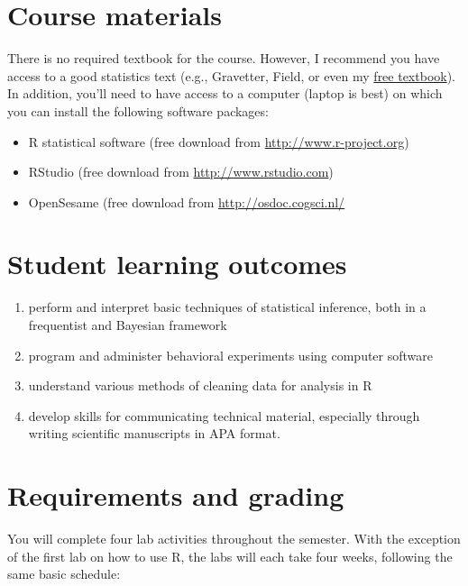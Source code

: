 \documentclass[10pt]{article}
\begin{document}
\section*{Course materials}
\label{sec:org4d7b8ef}

There is no required textbook for the course. However, I recommend you have access to a good statistics text (e.g., Gravetter, Field, or even my \href{https://learnstatswithjasp.com}{free textbook}).  In addition, you'll need to have access to a computer (laptop is best) on which you can install the following software packages:

\begin{itemize}
\item R statistical software (free download from \href{http://www.r-project.org}{http://www.r-project.org})
\item RStudio (free download from \href{http://www.rstudio.com}{http://www.rstudio.com})
\item OpenSesame (free download from \url{http://osdoc.cogsci.nl/}
\end{itemize}

\section*{Student learning outcomes}
\label{sec:org5684d9e}

\begin{enumerate}
\item perform and interpret basic techniques of statistical inference, both in a frequentist and Bayesian framework
\item program and administer behavioral experiments using computer software
\item understand various methods of cleaning data for analysis in R
\item develop skills for communicating technical material, especially through writing scientific manuscripts in APA format.
\end{enumerate}

\section*{Requirements and grading}
\label{sec:org368c260}

You will complete four lab activities throughout the semester. With the exception of the first lab on how to use R, the labs will each take four weeks, following the same basic schedule:
\end{document}
